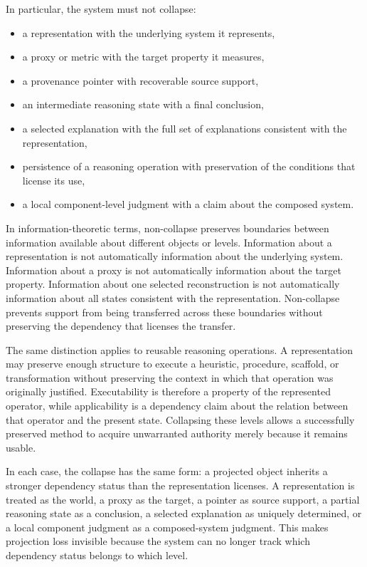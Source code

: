 \documentclass[11pt]{article}
\begin{document}
In particular, the system must not collapse:
\begin{itemize}[leftmargin=1.5em]
    \item a representation with the underlying system it represents,
    \item a proxy or metric with the target property it measures,
    \item a provenance pointer with recoverable source support,
    \item an intermediate reasoning state with a final conclusion,
    \item a selected explanation with the full set of explanations consistent with the representation,
    \item persistence of a reasoning operation with preservation of the conditions that license its use,
    \item a local component-level judgment with a claim about the composed system.
\end{itemize}

In information-theoretic terms, non-collapse preserves boundaries between information available about different objects or levels. Information about a representation is not automatically information about the underlying system. Information about a proxy is not automatically information about the target property. Information about one selected reconstruction is not automatically information about all states consistent with the representation. Non-collapse prevents support from being transferred across these boundaries without preserving the dependency that licenses the transfer.

The same distinction applies to reusable reasoning operations. A representation may preserve enough structure to execute a heuristic, procedure, scaffold, or transformation without preserving the context in which that operation was originally justified. Executability is therefore a property of the represented operator, while applicability is a dependency claim about the relation between that operator and the present state. Collapsing these levels allows a successfully preserved method to acquire unwarranted authority merely because it remains usable.

In each case, the collapse has the same form: a projected object inherits a stronger dependency status than the representation licenses. A representation is treated as the world, a proxy as the target, a pointer as source support, a partial reasoning state as a conclusion, a selected explanation as uniquely determined, or a local component judgment as a composed-system judgment. This makes projection loss invisible because the system can no longer track which dependency status belongs to which level.
\end{document}
